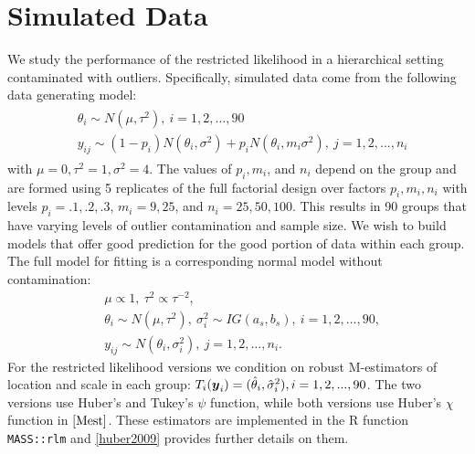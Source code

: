 \documentclass[12pt]{article}
\newcommand{\by}{\mbox{\boldmath $y$}}
\begin{document}
%
%

\section{Simulated Data}
We study the performance of the restricted likelihood in a hierarchical setting contaminated with outliers. Specifically, simulated data come from the following data generating model:
\begin{align}
\label{gensim2}
\begin{split}
& \theta_{i}  \sim   N(\mu, \tau^{2}),  \ i = 1, 2, \dots, 90  \\ 
& y_{ij} \sim (1-p_{i})N(\theta_{i}, \sigma^{2}) + p_{i}N(\theta_{i}, m_{i}\sigma^{2}),\  j = 1, 2,..., n_{i}
\end{split}
\end{align}
with $\mu = 0, \tau^{2} = 1, \sigma^{2} = 4$. The values of $p_{i}, m_{i}$, and $n_{i}$ depend on the group and are formed using 5 replicates of the full factorial design over factors $p_{i},m_{i},n_{i}$ with levels $p_{i} = .1, .2, .3$, $m_{i} = 9, 25$, and $n_{i} = 25, 50, 100$. This results in 90 groups that have varying levels of outlier contamination and sample size. We wish to build models that offer good prediction for the good portion of data within each group. The full model for fitting is a corresponding normal model without contamination:
\begin{equation}
\label{fullsim2}
\begin{split}
& \mu \propto 1, \  \tau^{2} \propto \tau^{-2}, \\
& \theta_{i}\sim N(\mu, \tau^{2}), \  \sigma^{2}_{i} \sim IG(a_{s}, b_{s}),  \ i = 1, 2, \dots, 90, \\ 
& y_{ij}\sim  N(\theta_{i},\sigma^{2}_{i}), \ j = 1, 2, \dots, n_{i}.
\end{split}
\end{equation}
For the restricted likelihood versions we condition on robust M-estimators of location and scale in each group: $T_{i}(\by_{i}) = (\hat\theta_{i}, \hat\sigma^{2}_{i}), i = 1, 2, ..., 90$. The two versions use Huber's and Tukey's $\psi$ function, while both versions use Huber's $\chi$ function in $\eqref{Mest}$. These estimators are implemented in the R function \texttt{MASS::rlm} and \ref{huber2009} provides further details on them. 
\end{document}
